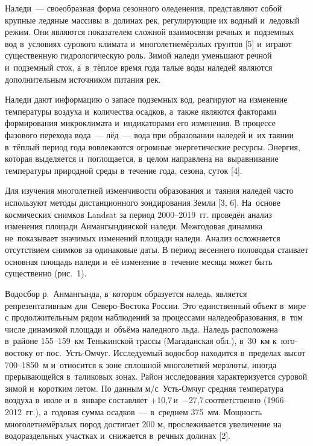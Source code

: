  

\makeProcTitle
{}

Наледи~--- своеобразная форма сезонного оледенения, представляют собой крупные ледяные массивы в~долинах рек, регулирующие их водный и~ледовый режим.  Они являются показателем сложной взаимосвязи речных и~подземных вод в~условиях сурового климата и~многолетнемёрзлых грунтов [5] и~играют существенную гидрологическую роль. Зимой наледи уменьшают речной и~подземный сток, а~в~тёплое время года талые воды наледей являются дополнительным источником питания рек.

Наледи дают информацию о запасе подземных вод, реагируют на изменение температуры воздуха и~количества осадков, а~также являются факторами формирования микроклимата и~индикаторами его изменения. В процессе фазового перехода вода~--- лёд~--- вода при образовании наледей и~их таянии в~тёплый период года вовлекаются огромные энергетические ресурсы. Энергия, которая выделяется и~поглощается, в~целом направлена на~выравнивание температуры природной среды в~течение года, сезона, суток [4].

Для изучения многолетней изменчивости образования и~таяния наледей часто используют методы дистанционного зондирования Земли [3, 6]. На~основе космических снимков Landsat за период 2000--2019~гг. проведён анализ изменения площади Анмангындинской наледи. Межгодовая динамика не~показывает значимых изменений площади наледи. Анализ осложняется отсутствием снимков за одинаковые даты. В период весеннего половодья стаивает основная площадь наледи и~её изменение в~течение месяца может быть существенно (рис.~1).



Водосбор р.~Анмангында, в~котором образуется наледь, является репрезентативным для~Северо-Востока России. Это единственный объект в~мире с продолжительным рядом наблюдений за процессами наледеобразования, в~том числе динамикой площади и~объёма наледного льда. Наледь расположена в~районе 155--159~км Тенькинской трассы (Магаданская обл.), в~30~км к~юго-востоку от пос.~Усть-Омчуг. Исследуемый водосбор находится в~пределах высот 700--1850~м и~относится к зоне сплошной многолетней мерзлоты, иногда прерывающейся в~таликовых зонах. Район исследования характеризуется суровой зимой и~коротким летом. По данным м/с~Усть-Омчуг средняя температура воздуха в~июле и~в~январе составляет +10,7\,\dgc и~$-$27,7\,\dgc соответственно (1966--2012~гг.), а~годовая сумма осадков~--- в~среднем 375~мм. Мощность многолетнемёрзлых пород достигает 200 м, прослеживается увеличение на водораздельных участках и~снижается в~речных долинах [2].

